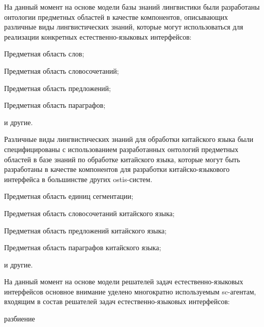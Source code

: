 На данный момент на основе модели базы знаний лингвистики были разработаны онтологии предметных областей в качестве компонентов, описывающих различные виды лингвистических знаний, которые могут использоваться для реализации конкретных естественно-языковых интерфейсов:
\begin{scnitemize}
	\item Предметная область слов;
	\item Предметная область словосочетаний;
	\item Предметная область предложений;
	\item Предметная область параграфов;
	\item и другие.
\end{scnitemize}


Различные виды лингвистических знаний для обработки китайского языка были специфицированы с использованием разработанных онтологий предметных областей в базе знаний по обработке китайского языка, которые могут быть разработаны в качестве компонентов для разработки китайско-языкового интерфейса в большинстве других ostis-систем.
\begin{scnitemize}
	\item Предметная область единиц сегментации;
	\item Предметная область словосочетаний китайского языка;
	\item Предметная область предложений китайского языка;
	\item Предметная область параграфов китайского языка;
	\item и другие.
\end{scnitemize}


На данный момент на основе модели решателей задач естественно-языковых интерфейсов основное внимание уделено многократно используемым sc-агентам, входящим в состав решателей задач естественно-языковых интерфейсов:
\begin{SCn}
	\begin{scnrelfromset}{разбиение}
	\end{scnrelfromset}
\end{SCn}


